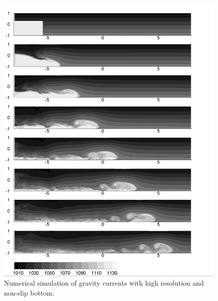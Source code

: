 \begin{figure}[htbp]
\includegraphics[width=6in]{../figures/GraCur/GraCur-1-Dom-High-RCIP1-Nslip.pdf}
\caption{Numerical simulation of gravity currents with high resolution and non-slip bottom.}
\label{fig:GraCur-1-Dom-High-RCIP1-Nslip}
\end{figure}

